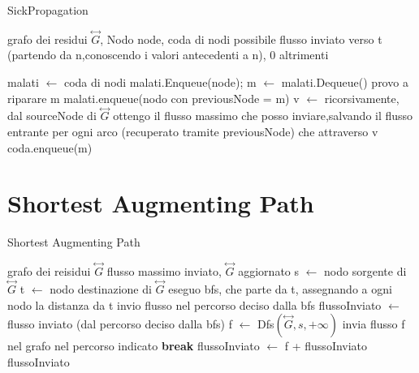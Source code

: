 \documentclass{article}
\begin{document}
\begin{algorithm}
\caption{SickPropagation}
\begin{algorithmic}
\REQUIRE grafo dei residui $\overset{\leftrightarrow}{G}$, Nodo node, coda di nodi
\ENSURE possibile flusso inviato verso t (partendo da n,conoscendo i valori antecedenti a n), 0 altrimenti

\STATE malati $\leftarrow$ coda di nodi
\STATE malati.Enqueue(node);
\STATE m $\leftarrow$ malati.Dequeue()
\STATE provo a riparare m
\STATE malati.enqueue(nodo con previousNode = m)
\STATE v $\leftarrow$ ricorsivamente, dal sourceNode di $\overset{\leftrightarrow}{G}$ ottengo il flusso massimo che posso inviare,salvando il flusso entrante per ogni arco (recuperato tramite previousNode) che attraverso
\RETURN v
\ELSE
\STATE coda.enqueue(m)
\ENDIF
\ENDWHILE
{}
\end{algorithmic}
\end{algorithm}

\section{Shortest Augmenting Path}
\begin{algorithm}
\caption{Shortest Augmenting Path}
\begin{algorithmic}
\REQUIRE grafo dei reisidui $\overset{\leftrightarrow}{G}$
\ENSURE flusso massimo inviato, $\overset{\leftrightarrow}{G}$ aggiornato
\STATE s $\leftarrow$ nodo sorgente di $\overset{\leftrightarrow}{G}$
\STATE t $\leftarrow$ nodo destinazione di $\overset{\leftrightarrow}{G}$
\STATE eseguo bfs, che parte da t, assegnando a ogni nodo la distanza da t 
\STATE invio flusso nel percorso deciso dalla bfs
\STATE flussoInviato $\leftarrow$ flusso inviato (dal percorso deciso dalla bfs)
\STATE f $\leftarrow$ Dfs$(\overset{\leftrightarrow}{G}, s, +\infty)$
\STATE invia flusso f nel grafo nel percorso indicato
\ELSE
\STATE \textbf{break}
\ENDIF
\STATE flussoInviato $\leftarrow$ f + flussoInviato 
\ENDWHILE
\RETURN flussoInviato
\end{algorithmic}
\end{algorithm}
\end{document}
